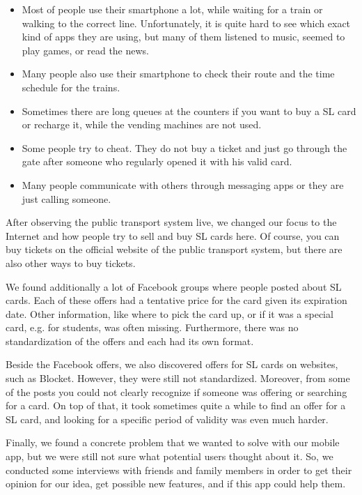 \documentclass[11pt,twoside,a4paper]{report}
\begin{document}
\begin{itemize}
\item Most of people use their smartphone a lot, while waiting for a train or walking to the correct line. Unfortunately, it is quite hard to see which exact kind of apps they are using, but many of them listened to music, seemed to play games, or read the news.
\item Many people also use their smartphone to check their route and the time schedule for the trains.
\item Sometimes there are long queues at the counters if you want to buy a SL card or recharge it, while the vending machines are not used.
\item Some people try to cheat. They do not buy a ticket and just go through the gate after someone who regularly opened it with his valid card.
\item Many people communicate with others through messaging apps or they are just calling someone.
\end{itemize}

After observing the public transport system live, we changed our focus to the Internet and how people try to sell and buy SL cards here. Of course, you can buy tickets on the official website of the public transport system, but there are also other ways to buy tickets.

We found additionally a lot of Facebook groups where people posted about SL cards. Each of these offers had a tentative price for the card given its expiration date. Other information, like where to pick the card up, or if it was a special card, e.g. for students, was often missing. Furthermore, there was no standardization of the offers and each had its own format.

Beside the Facebook offers, we also discovered offers for SL cards on websites, such as Blocket. However, they were still not standardized. Moreover, from some of the posts you could not clearly recognize if someone was offering or searching for a card. On top of that, it took sometimes quite a while to find an offer for a SL card, and looking for a specific period of validity was even much harder.

Finally, we found a concrete problem that we wanted to solve with our mobile app, but we were still not sure what potential users thought about it. So, we conducted some interviews with friends and family members in order to get their opinion for our idea, get possible new features, and if this app could help them.
\end{document}
